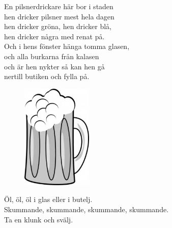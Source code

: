 \documentclass[a6paper, 10pt, twoside]{article}
\begin{document}
\begin{center}
\end{center}
\begin{lyrics}
En pilsnerdrickare här bor i staden\\
hen dricker pilsner mest hela dagen\\
hen dricker gröna, hen dricker blå,\\
hen dricker några med renat på.\\
Och i hens fönster hänga tomma glasen,\\
och alla burkarna från kalasen\\
och är hen nykter så kan hen gå\\
nertill butiken och fylla på.
\end{lyrics}
\begin{figure}[!h]
\hspace{30pt}\includegraphics[width=0.3\textwidth]{ol.jpg}
\end{figure}
\begin{center}
\end{center}
\begin{lyrics}
Öl, öl, öl i glas eller i butelj.\\
Skummande, skummande, skummande, skummande.\\
Ta en klunk och svälj.
\end{lyrics}
\end{document}
